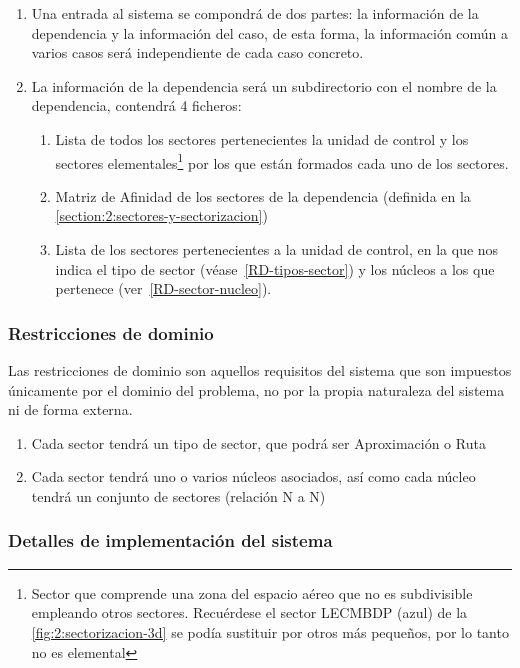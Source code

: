 \begin{enumerate}[label={\textbf{RIO\arabic*}}]
	\item  Una entrada al sistema se compondrá de dos partes: la información de la dependencia y la información del caso,
	de esta forma, la información común a varios casos será independiente de cada caso concreto.
	\item La información de la dependencia será un subdirectorio con el nombre de la dependencia, contendrá 4 ficheros:
	\begin{enumerate}[label*={\textbf{.\arabic*}}]
		\item  Lista de todos los sectores pertenecientes la unidad de control y los sectores elementales\footnote{
			Sector que comprende una zona del espacio aéreo que no es subdivisible empleando otros sectores. Recuérdese el sector LECMBDP (azul) de la \autoref{fig:2:sectorizacion-3d} se podía sustituir por otros más pequeños, por lo tanto no es elemental
		} por los que están formados cada uno de los sectores.
		
		\item  Matriz de Afinidad de los sectores de la dependencia (definida en la 	\autoref{section:2:sectores-y-sectorizacion})
		\item Lista de los sectores pertenecientes a la unidad de control, en la que nos indica el tipo de sector (véase~\ref{RD-tipos-sector}) y los núcleos a los que pertenece (ver~\ref{RD-sector-nucleo}).
	\end{enumerate}
	
\end{enumerate}


\subsubsection{Restricciones de dominio}
Las restricciones de dominio son aquellos requisitos del sistema que son impuestos únicamente por el dominio del problema, no por la propia naturaleza del sistema ni de forma externa.

\begin{enumerate}[label={\textbf{RD\arabic*}}]
	\item \label{RD-tipos-sector}  Cada sector tendrá un tipo de sector, que podrá ser Aproximación o Ruta
	\item  \label{RD-sector-nucleo} Cada sector tendrá uno o varios núcleos asociados, así como cada núcleo tendrá un conjunto de sectores (relación N a N)
	
\end{enumerate}

\subsubsection{Detalles de implementación del sistema}
\label{sec:detalles-impl-sistema}
